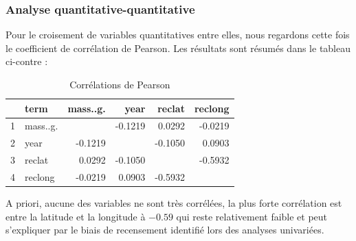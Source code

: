\documentclass[12pt]{article}
\begin{document}
\subsubsection*{Analyse quantitative-quantitative}
Pour le croisement de variables quantitatives entre elles, nous regardons cette fois le coefficient de corrélation de Pearson. Les résultats sont résumés dans le tableau ci-contre :
\begin{table}[H]
\centering
\begin{tabular}{rlrrrr}
  \hline
 & term & mass..g. & year & reclat & reclong \\ 
  \hline
1 & mass..g. &  & -0.1219 & 0.0292 & -0.0219 \\ 
  2 & year & -0.1219 &  & -0.1050 & 0.0903 \\ 
  3 & reclat & 0.0292 & -0.1050 &  & -0.5932 \\ 
  4 & reclong & -0.0219 & 0.0903 & -0.5932 &  \\ 
   \hline
\end{tabular}
\caption{Corrélations de Pearson}
\end{table}
A priori, aucune des variables ne sont très corrélées, la plus forte corrélation est entre la latitude et la longitude à $-0.59$ qui reste relativement faible et peut s'expliquer par le biais de recensement identifié lors des analyses univariées.
\end{document}
